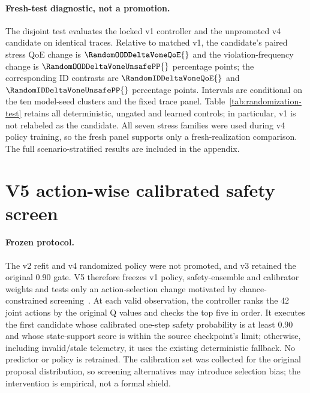 \documentclass[10pt]{article}
\providecommand{\randomizationpath}{generated-randomization}
\begin{document}
\paragraph{Fresh-test diagnostic, not a promotion.}
The disjoint test evaluates the locked v1 controller and the unpromoted v4 candidate on identical traces. Relative to matched v1, the candidate's paired stress QoE change is $\RandomOODDeltaVoneQoE{}$ and the violation-frequency change is $\RandomOODDeltaVoneUnsafePP{}$ percentage points; the corresponding ID contrasts are $\RandomIDDeltaVoneQoE{}$ and $\RandomIDDeltaVoneUnsafePP{}$ percentage points. Intervals are conditional on the ten model-seed clusters and the fixed trace panel. Table~\ref{tab:randomization-test} retains all deterministic, ungated and learned controls; in particular, v1 is not relabeled as the candidate. All seven stress families were used during v4 policy training, so the fresh panel supports only a fresh-realization comparison. The full scenario-stratified results are included in the appendix.

\begin{table}[t]
\centering\resizebox{\textwidth}{!}{}
\caption{V4 fresh-test controller outcomes. The policy-randomized RLCD candidate is shown for diagnosis but was not promoted; RLCD v1 is the controller selected by the pre-test validation lock. Intervals condition on the fixed trace panel and resample model seeds.}
\label{tab:randomization-test}
\end{table}

\begin{table}[t]
\centering\resizebox{\textwidth}{!}{}
\caption{V4 paired fresh-test candidate-minus-reference effects. Violation-rate contrasts are percentage points; intervals condition on this trace panel and resample ten model seeds.}
\label{tab:randomization-contrasts}
\end{table}

\section{V5 action-wise calibrated safety screen}
\paragraph{Frozen protocol.}
The v2 refit and v4 randomized policy were not promoted, and v3 retained the original 0.90 gate. V5 therefore freezes v1 policy, safety-ensemble and calibrator weights and tests only an action-selection change motivated by chance-constrained screening~\cite{chen2023acs}. At each valid observation, the controller ranks the 42 joint actions by the original Q values and checks the top five in order. It executes the first candidate whose calibrated one-step safety probability is at least 0.90 and whose state-support score is within the source checkpoint's limit; otherwise, including invalid/stale telemetry, it uses the existing deterministic fallback. No predictor or policy is retrained. The calibration set was collected for the original proposal distribution, so screening alternatives may introduce selection bias; the intervention is empirical, not a formal shield.
\end{document}
